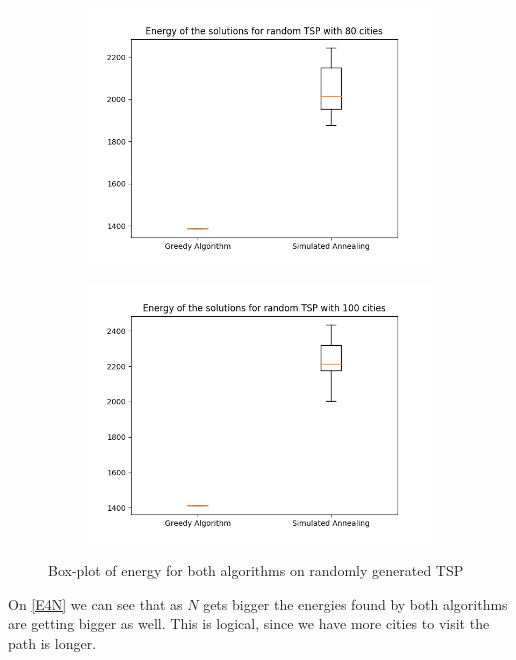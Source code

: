 \documentclass[14pt]
{article}
\begin{document}
\begin{figure}[H]
\begin{subfigure}{0.49\textwidth}
\includegraphics[width = \textwidth]{img/E80.png}
\end{subfigure}
\begin{subfigure}{0.49\textwidth}
\centering
\includegraphics[width = \textwidth]{img/E100.png}
\end{subfigure}
\caption{\label{EBoth} Box-plot of energy for both algorithms on randomly generated TSP}
\end{figure}

On \autoref{E4N} we can see that as $N$ gets bigger the energies found by both algorithms are getting bigger as well. This is logical, since we have more cities to visit the path is longer.
\end{document}
